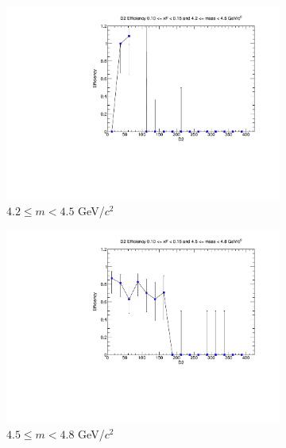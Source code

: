 \begin{figure}[p]
    \centering
    \begin{subfigure}[b]{0.32\textwidth}
        \centering
        \includegraphics[width=\textwidth]{./kTrackerEfficiencyPlots/D2_Efficiency_xF2_mass0.pdf}
        \caption{$4.2 \leq m < 4.5$ GeV/$c^2$}
        \label{fig:xF2_mass0}
    \end{subfigure}
    \hfill
    \begin{subfigure}[b]{0.32\textwidth}
        \centering
        \includegraphics[width=\textwidth]{./kTrackerEfficiencyPlots/D2_Efficiency_xF2_mass1.pdf}
        \caption{$4.5 \leq m < 4.8$ GeV/$c^2$}
        \label{fig:xF2_mass1}
    \end{subfigure}
    \hfill
    \begin{subfigure}[b]{0.32\textwidth}

\end{subfigure}
\end{figure}
